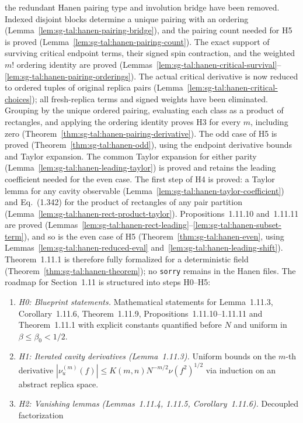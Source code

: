 \begin{remark}
the redundant Hanen pairing type and involution bridge have been removed.
Indexed disjoint blocks determine a unique pairing with an ordering
(Lemma~\ref{lem:sg-tal:hanen-pairing-bridge}), and the pairing count needed for H5 is proved (Lemma~\ref{lem:sg-tal:hanen-pairing-count}).
The exact support of surviving critical endpoint terms, their signed spin contraction,
and the weighted $m!$ ordering identity are proved
(Lemmas~\ref{lem:sg-tal:hanen-critical-survival}--\ref{lem:sg-tal:hanen-pairing-orderings}).
The actual critical derivative is now reduced to ordered tuples of original
replica pairs (Lemma~\ref{lem:sg-tal:hanen-critical-choices}); all fresh-replica terms
and signed weights have been eliminated. Grouping by the unique ordered pairing,
evaluating each class as a product of rectangles, and applying the ordering
identity proves H3 for every $m$, including zero
(Theorem~\ref{thm:sg-tal:hanen-pairing-derivative}).
The odd case of H5 is proved (Theorem~\ref{thm:sg-tal:hanen-odd}), using the endpoint
derivative bounds and Taylor expansion. The common Taylor expansion for either parity
(Lemma~\ref{lem:sg-tal:hanen-leading-taylor}) is proved and retains the leading coefficient
needed for the even case. The first step of H4 is proved: a Taylor lemma for any cavity observable
(Lemma~\ref{lem:sg-tal:hanen-taylor-coefficient}) and Eq.~(1.342) for the product of rectangles of any pair partition
(Lemma~\ref{lem:sg-tal:hanen-rect-product-taylor}).
Propositions~1.11.10 and~1.11.11 are proved (Lemmas~\ref{lem:sg-tal:hanen-rect-leading}--\ref{lem:sg-tal:hanen-subset-term}),
and so is the even case of H5 (Theorem~\ref{thm:sg-tal:hanen-even}, using Lemmas~\ref{lem:sg-tal:hanen-reduced-eval} and~\ref{lem:sg-tal:hanen-leading-shift}).
Theorem~1.11.1 is therefore fully formalized for a deterministic field (Theorem~\ref{thm:sg-tal:hanen-theorem}); no \texttt{sorry} remains in the Hanen files.
The roadmap for Section~1.11 is structured into steps H0--H5:
\begin{enumerate}
\item \emph{H0: Blueprint statements.} Mathematical statements for Lemma~1.11.3,
Corollary~1.11.6, Theorem~1.11.9, Propositions~1.11.10--1.11.11 and Theorem~1.11.1
with explicit constants quantified before $N$ and uniform in $\beta \le \beta_0 < 1/2$.
\item \emph{H1: Iterated cavity derivatives (Lemma~1.11.3).} Uniform bounds on the $m$-th derivative
$|\nu_u^{(m)}(f)| \le K(m, n) N^{-m/2} \nu(f^2)^{1/2}$ via induction on an abstract replica space.
\item \emph{H2: Vanishing lemmas (Lemmas~1.11.4, 1.11.5, Corollary~1.11.6).} Decoupled factorization

\end{enumerate}
\end{remark}
